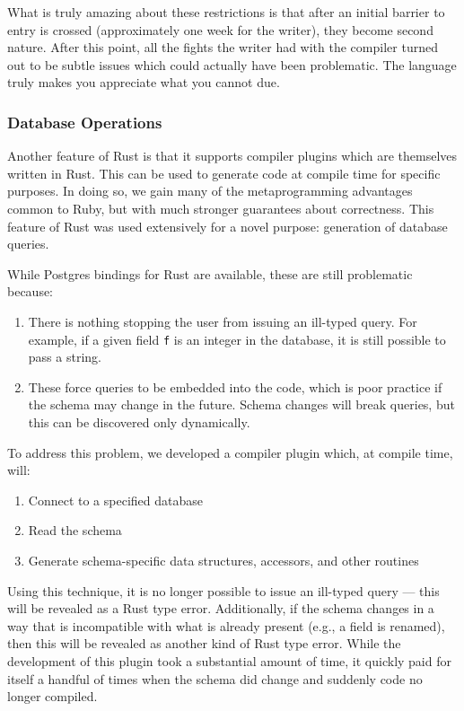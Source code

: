 \documentclass{scrartcl}
\begin{document}
What is truly amazing about these restrictions is that after an initial barrier to entry is crossed (approximately one week for the writer), they become second nature.
After this point, all the fights the writer had with the compiler turned out to be subtle issues which could actually have been problematic.
The language truly makes you appreciate what you cannot due.

\subsubsection{Database Operations}
Another feature of Rust is that it supports compiler plugins which are themselves written in Rust.
This can be used to generate code at compile time for specific purposes.
In doing so, we gain many of the metaprogramming advantages common to Ruby, but with much stronger guarantees about correctness.
This feature of Rust was used extensively for a novel purpose: generation of database queries.

While Postgres bindings for Rust are available, these are still problematic because:
\begin{enumerate}
  \item There is nothing stopping the user from issuing an ill-typed query.
    For example, if a given field \texttt{f} is an integer in the database, it is still possible to pass a string.

  \item These force queries to be embedded into the code, which is poor practice if the schema may change in the future.
    Schema changes will break queries, but this can be discovered only dynamically.
\end{enumerate}

To address this problem, we developed a compiler plugin which, at compile time, will:
\begin{enumerate}
  \item Connect to a specified database
  \item Read the schema
  \item Generate schema-specific data structures, accessors, and other routines
\end{enumerate}
Using this technique, it is no longer possible to issue an ill-typed query --- this will be revealed as a Rust type error.
Additionally, if the schema changes in a way that is incompatible with what is already present (e.g., a field is renamed), then this will be revealed as another kind of Rust type error.
While the development of this plugin took a substantial amount of time, it quickly paid for itself a handful of times when the schema did change and suddenly code no longer compiled.
\end{document}
